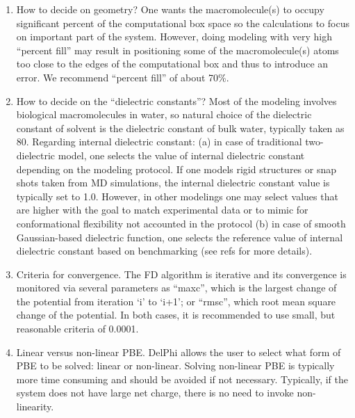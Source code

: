 \documentclass[9pt,tutorial,pubversion]{livecoms}
\begin{document}
\begin{enumerate}
    \item How to decide on geometry? One wants the macromolecule(s) to occupy significant percent of the computational box space so the calculations to focus on important part of the system. However, doing modeling with very high ``percent fill'' may result in positioning some of the macromolecule(s) atoms too close to the edges of the computational box and thus to introduce an error. We recommend ``percent fill'' of about 70\%. 

    \item How to decide on the ``dielectric constants''? Most of the modeling involves biological macromolecules in water, so natural choice of the dielectric constant of solvent is the dielectric constant of bulk water, typically taken as 80. Regarding internal dielectric constant: (a) in case of traditional two-dielectric model, one selects the value of internal dielectric constant depending on the modeling protocol. If one models rigid structures or snap shots taken from MD simulations, the internal dielectric constant value is typically set to 1.0. However, in other modelings one may select values that are higher with the goal to match experimental data or to mimic for conformational flexibility not accounted in the protocol (b) in case of smooth Gaussian-based dielectric function, one selects the reference value of internal dielectric constant based on benchmarking (see refs\cite{li2014modeling,li2013progress,wang2015pka,wang2015delphipka} for more details).  

    \item Criteria for convergence. The FD algorithm is iterative and its convergence is monitored via several parameters as ``maxc'', which is the largest change of the potential from iteration `i' to `i+1'; or ``rmsc'', which root mean square change of the potential. In both cases, it is recommended to use small, but reasonable criteria of 0.0001. 

    \item Linear versus non-linear PBE. DelPhi allows the user to select what form of PBE to be solved: linear or non-linear. Solving non-linear PBE is typically more time consuming and should be avoided if not necessary. Typically, if the system does not have large net charge, there is no need to invoke non-linearity\cite{talley2008electrostatic,chakavorty2016electrostatic}.
\end{enumerate}
\end{document}

